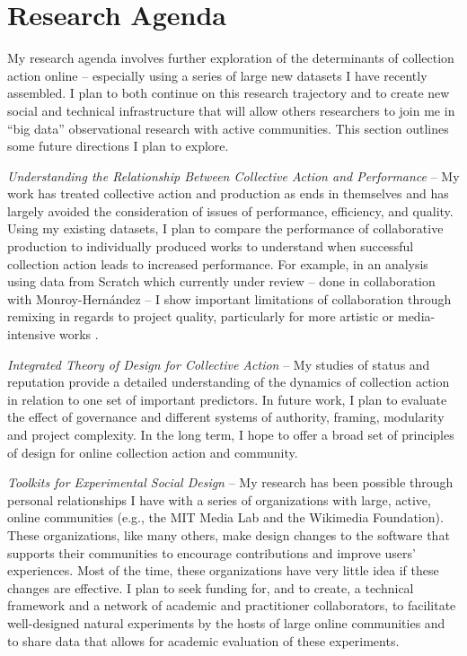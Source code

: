 \documentclass[10pt]{memoir}
\begin{document}

\section{Research Agenda}

My research agenda involves further exploration of the determinants of
collection action online -- especially using a series of large new
datasets I have recently assembled. I plan to both continue on this
research trajectory and to create new social and technical
infrastructure that will allow others researchers to join me in ``big
data'' observational research with active communities. This section
outlines some future directions I plan to explore.

\emph{Understanding the Relationship Between Collective Action and
  Performance} -- My work has treated collective action and production
as ends in themselves and has largely avoided the consideration of
issues of performance, efficiency, and quality. Using my existing
datasets, I plan to compare the performance of collaborative
production to individually produced works to understand when
successful collection action leads to increased performance. For
example, in an analysis using data from Scratch which currently under
review -- done in collaboration with Monroy-Hernández -- I show
important limitations of collaboration through remixing in regards to
project quality, particularly for more artistic or media-intensive
works \cite{hill_cost_2012}.

\emph{Integrated Theory of Design for Collective Action} -- My studies
of status and reputation provide a detailed understanding of the dynamics of
collection action in relation to one set of important predictors. In future
work, I plan to evaluate the effect of governance and different
systems of authority, framing, modularity and project complexity. In
the long term, I hope to offer a broad set of principles of
design for online collection action and community.

\emph{Toolkits for Experimental Social Design} -- My research has been
possible through personal relationships I have with a series of
organizations with large, active, online communities (e.g., the MIT
Media Lab and the Wikimedia Foundation). These organizations, like
many others, make design changes to the software that supports their
communities to encourage contributions and improve users'
experiences. Most of the time, these organizations have very little
idea if these changes are effective. I plan to seek funding for, and
to create, a technical framework and a network of academic and
practitioner collaborators, to facilitate well-designed natural
experiments by the hosts of large online communities and to share data
that allows for academic evaluation of these experiments.
\end{document}

